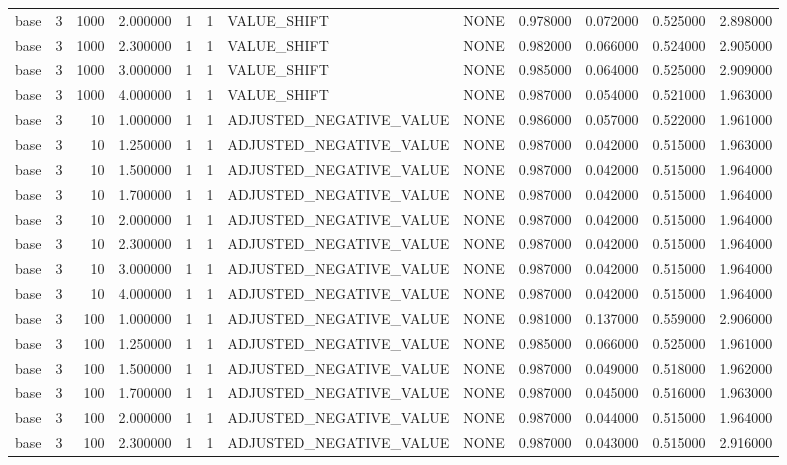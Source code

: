\begin{tabular}{lrrrllllrrrr}
base & 3 & 1000 & 2.000000 & 1 & 1 & VALUE_SHIFT & NONE & 0.978000 & 0.072000 & 0.525000 & 2.898000 \\
base & 3 & 1000 & 2.300000 & 1 & 1 & VALUE_SHIFT & NONE & 0.982000 & 0.066000 & 0.524000 & 2.905000 \\
base & 3 & 1000 & 3.000000 & 1 & 1 & VALUE_SHIFT & NONE & 0.985000 & 0.064000 & 0.525000 & 2.909000 \\
base & 3 & 1000 & 4.000000 & 1 & 1 & VALUE_SHIFT & NONE & 0.987000 & 0.054000 & 0.521000 & 1.963000 \\
base & 3 & 10 & 1.000000 & 1 & 1 & ADJUSTED_NEGATIVE_VALUE & NONE & 0.986000 & 0.057000 & 0.522000 & 1.961000 \\
base & 3 & 10 & 1.250000 & 1 & 1 & ADJUSTED_NEGATIVE_VALUE & NONE & 0.987000 & 0.042000 & 0.515000 & 1.963000 \\
base & 3 & 10 & 1.500000 & 1 & 1 & ADJUSTED_NEGATIVE_VALUE & NONE & 0.987000 & 0.042000 & 0.515000 & 1.964000 \\
base & 3 & 10 & 1.700000 & 1 & 1 & ADJUSTED_NEGATIVE_VALUE & NONE & 0.987000 & 0.042000 & 0.515000 & 1.964000 \\
base & 3 & 10 & 2.000000 & 1 & 1 & ADJUSTED_NEGATIVE_VALUE & NONE & 0.987000 & 0.042000 & 0.515000 & 1.964000 \\
base & 3 & 10 & 2.300000 & 1 & 1 & ADJUSTED_NEGATIVE_VALUE & NONE & 0.987000 & 0.042000 & 0.515000 & 1.964000 \\
base & 3 & 10 & 3.000000 & 1 & 1 & ADJUSTED_NEGATIVE_VALUE & NONE & 0.987000 & 0.042000 & 0.515000 & 1.964000 \\
base & 3 & 10 & 4.000000 & 1 & 1 & ADJUSTED_NEGATIVE_VALUE & NONE & 0.987000 & 0.042000 & 0.515000 & 1.964000 \\
base & 3 & 100 & 1.000000 & 1 & 1 & ADJUSTED_NEGATIVE_VALUE & NONE & 0.981000 & 0.137000 & 0.559000 & 2.906000 \\
base & 3 & 100 & 1.250000 & 1 & 1 & ADJUSTED_NEGATIVE_VALUE & NONE & 0.985000 & 0.066000 & 0.525000 & 1.961000 \\
base & 3 & 100 & 1.500000 & 1 & 1 & ADJUSTED_NEGATIVE_VALUE & NONE & 0.987000 & 0.049000 & 0.518000 & 1.962000 \\
base & 3 & 100 & 1.700000 & 1 & 1 & ADJUSTED_NEGATIVE_VALUE & NONE & 0.987000 & 0.045000 & 0.516000 & 1.963000 \\
base & 3 & 100 & 2.000000 & 1 & 1 & ADJUSTED_NEGATIVE_VALUE & NONE & 0.987000 & 0.044000 & 0.515000 & 1.964000 \\
base & 3 & 100 & 2.300000 & 1 & 1 & ADJUSTED_NEGATIVE_VALUE & NONE & 0.987000 & 0.043000 & 0.515000 & 2.916000 \\

\end{tabular}

